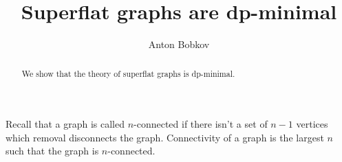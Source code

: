 \documentclass{amsart}
\begin{document}
\title{Superflat graphs are dp-minimal}
\author{Anton Bobkov}

\begin{abstract}
	We show that the theory of superflat graphs is dp-minimal.
\end{abstract}

\maketitle

Recall that a graph is called $n$-connected if there isn't a set of $n-1$ vertices which removal disconnects the graph. Connectivity of a graph is the largest $n$ such that the graph is $n$-connected.
\end{document}
